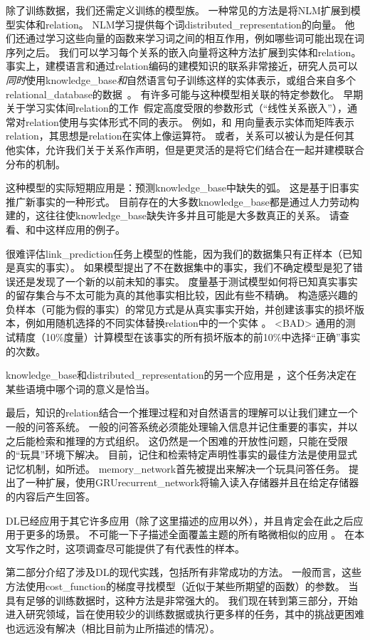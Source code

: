 除了训练数据，我们还需定义训练的模型族。
一种常见的方法是将\gls{NLM}扩展到模型实体和\gls{relation}。
\gls{NLM}学习提供每个词\gls{distributed_representation}的向量。
他们还通过学习这些向量的函数来学习词之间的相互作用，例如哪些词可能出现在词序列之后。
我们可以学习每个关系的嵌入向量将这种方法扩展到实体和\gls{relation}。
事实上，建模语言和通过\gls{relation}编码的建模知识的联系非常接近，研究人员可以\emph{同时}使用\gls{knowledge_base}\emph{和}自然语言句子训练这样的实体表示\citep{bordes-aaai-2011,Bordes-et-al-AISTATS2012-small,Wang-et-al-EMNLP2014}，或组合来自多个\gls{relational_database}的数据~\citep{Bordes-et-al-NIPS2013}。
有许多可能与这种模型相关联的特定参数化。
早期关于学习实体间\gls{relation}的工作~\citep{Paccanaro2000}假定高度受限的参数形式（``线性关系嵌入''），通常对\gls{relation}使用与实体形式不同的表示。
例如，\citet{Paccanaro2000}和\citet{bordes-aaai-2011} 用向量表示实体而矩阵表示\gls{relation}，其思想是\gls{relation}在实体上像运算符。
或者，关系可以被认为是任何其他实体\citep{Bordes-et-al-AISTATS2012-small}，允许我们关于关系作声明，但是更灵活的是将它们结合在一起并建模联合分布的机制。

这种模型的实际短期应用是：预测\gls{knowledge_base}中缺失的弧。
这是基于旧事实推广新事实的一种形式。
目前存在的大多数\gls{knowledge_base}都是通过人力劳动构建的，这往往使\gls{knowledge_base}缺失许多并且可能是大多数真正的关系。
请查看\citet{Wang-et-al-AAAI2014}、\citet{Lin-et-al-AAAI2015}和\citet{Garcia-Duran-et-al-arxiv2015}中这样应用的例子。

很难评估\gls{link_prediction}任务上模型的性能，因为我们的数据集只有正样本（已知是真实的事实）。
如果模型提出了不在数据集中的事实，我们不确定模型是犯了错误还是发现了一个新的以前未知的事实。
度量基于测试模型如何将已知真实事实的留存集合与不太可能为真的其他事实相比较，因此有些不精确。
构造感兴趣的负样本（可能为假的事实）的常见方式是从真实事实开始，并创建该事实的损坏版本，例如用随机选择的不同实体替换\gls{relation}中的一个实体 。
<BAD> 通用的测试精度（10$\%$度量）计算模型在该事实的所有损坏版本的前10$\%$中选择``正确''事实的次数。

\gls{knowledge_base}和\gls{distributed_representation}的另一个应用是 \citep{Navigli+Verlardi-2005,Bordes-et-al-AISTATS2012-small}，这个任务决定在某些语境中哪个词的意义是恰当。

最后，知识的\gls{relation}结合一个推理过程和对自然语言的理解可以让我们建立一个一般的问答系统。
一般的问答系统必须能处理输入信息并记住重要的事实，并以之后能检索和推理的方式组织。
这仍然是一个困难的开放性问题，只能在受限的``玩具''环境下解决。
目前，记住和检索特定声明性事实的最佳方法是使用显式记忆机制，如所述。
\gls{memory_network}首先被提出来解决一个玩具问答任务\citep{Weston2014}。
\citet{Kumar-et-al-arxiv2015} 提出了一种扩展，使用GRU\gls{recurrent_network}将输入读入存储器并且在给定存储器的内容后产生回答。

\gls{DL}已经应用于其它许多应用（除了这里描述的应用以外），并且肯定会在此之后应用于更多的场景。
不可能一下子描述全面覆盖主题的所有略微相似的应用 。
在本文写作之时，这项调查尽可能提供了有代表性的样本。

第二部分介绍了涉及\gls{DL}的现代实践，包括所有非常成功的方法。
一般而言，这些方法使用\gls{cost_function}的梯度寻找模型（近似于某些所期望的函数）的参数。
当具有足够的训练数据时，这种方法是非常强大的。
我们现在转到第三部分，开始进入研究领域，旨在使用较少的训练数据或执行更多样的任务，其中的挑战更困难也远远没有解决（相比目前为止所描述的情况）。
